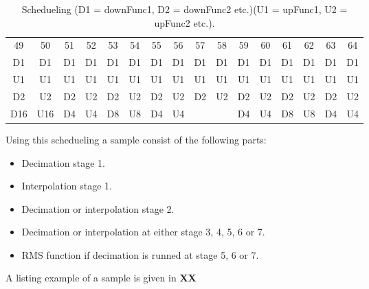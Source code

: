 \begin{table}[H]
\begin{tabular}{|c|c|c|c|c|c|c|c|c|c|c|c|c|c|c|c|}
\rowcolor[HTML]{C0C0C0} 
\multicolumn{16}{|c|}{\cellcolor[HTML]{C0C0C0}Sample}                             \\ \hline
\rowcolor[HTML]{C0C0C0} 
49  & 50  & 51 & 52 & 53 & 54 & 55 & 56 & 57  & 58  & 59 & 60 & 61 & 62 & 63 & 64 \\ \hline
D1  & D1  & D1 & D1 & D1 & D1 & D1 & D1 & D1  & D1  & D1 & D1 & D1 & D1 & D1 & D1 \\ \hline
U1  & U1  & U1 & U1 & U1 & U1 & U1 & U1 & U1  & U1  & U1 & U1 & U1 & U1 & U1 & U1 \\ \hline
D2  & U2  & D2 & U2 & D2 & U2 & D2 & U2 & D2  & U2  & D2 & U2 & D2 & U2 & D2 & U2 \\ \hline
D16 & U16 & D4 & U4 & D8 & U8 & D4 & U4 &     &     & D4 & U4 & D8 & U8 & D4 & U4 \\ \hline
\end{tabular}
\caption{Schedueling (D1 = downFunc1, D2 = downFunc2 etc.)(U1 = upFunc1, U2 = upFunc2 etc.).}
\label{tb:schedueling}
\end{table}


Using this schedueling a sample consist of the following parts:
\begin{itemize}
\item Decimation stage 1.
\item Interpolation stage 1.
\item Decimation or interpolation stage 2.
\item Decimation or interpolation at either stage 3, 4, 5, 6 or 7. 
\item RMS function if decimation is runned at stage 5, 6 or 7.
\end{itemize}

A listing example of a sample is given in \textbf{XX} 

